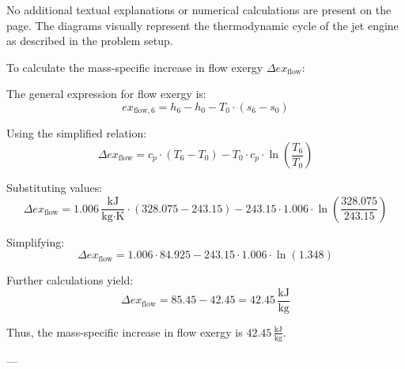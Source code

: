No additional textual explanations or numerical calculations are present on the page. The diagrams visually represent the thermodynamic cycle of the jet engine as described in the problem setup.

To calculate the mass-specific increase in flow exergy \( \Delta ex_{\text{flow}} \):  

The general expression for flow exergy is:  
\[
ex_{\text{flow},6} = h_6 - h_0 - T_0 \cdot (s_6 - s_0)
\]  

Using the simplified relation:  
\[
\Delta ex_{\text{flow}} = c_p \cdot (T_6 - T_0) - T_0 \cdot c_p \cdot \ln \left( \frac{T_6}{T_0} \right)
\]  

Substituting values:  
\[
\Delta ex_{\text{flow}} = 1.006 \, \frac{\text{kJ}}{\text{kg·K}} \cdot (328.075 - 243.15) - 243.15 \cdot 1.006 \cdot \ln \left( \frac{328.075}{243.15} \right)
\]  

Simplifying:  
\[
\Delta ex_{\text{flow}} = 1.006 \cdot 84.925 - 243.15 \cdot 1.006 \cdot \ln \left( 1.348 \right)
\]  

Further calculations yield:  
\[
\Delta ex_{\text{flow}} = 85.45 - 42.45 = 42.45 \, \frac{\text{kJ}}{\text{kg}}
\]  

Thus, the mass-specific increase in flow exergy is \( 42.45 \, \frac{\text{kJ}}{\text{kg}} \).  

---